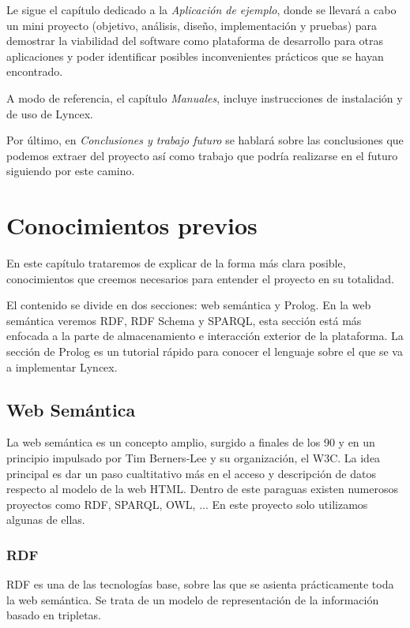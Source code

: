 \documentclass[openright,twoside,12pt]{book}
\begin{document}
Le sigue el capítulo dedicado a la \textit{Aplicación de ejemplo}, donde se llevará a cabo un mini proyecto (objetivo, análisis, diseño, implementación y pruebas) para demostrar la viabilidad del software como plataforma de desarrollo para otras aplicaciones y poder identificar posibles inconvenientes prácticos que se hayan encontrado.

A modo de referencia, el capítulo \textit{Manuales}, incluye instrucciones de instalación y de uso de Lyncex.

Por último, en \textit{Conclusiones y trabajo futuro} se hablará sobre las conclusiones que podemos extraer del proyecto así como trabajo que podría realizarse en el futuro siguiendo por este camino.


\chapter{Conocimientos previos}

En este capítulo trataremos de explicar de la forma más clara posible, conocimientos que creemos necesarios para entender el proyecto en su totalidad.

El contenido se divide en dos secciones: web semántica y Prolog. En la web semántica veremos RDF, RDF Schema y SPARQL, esta sección está más enfocada a la parte de almacenamiento e interacción exterior de la plataforma. La sección de Prolog es un tutorial rápido para conocer el lenguaje sobre el que se va a implementar Lyncex.

\section{Web Semántica}

La web semántica es un concepto amplio\cite{semanticweb}, surgido a finales de los 90 y en un principio impulsado por Tim Berners-Lee y su organización, el W3C. La idea principal es dar un paso cualtitativo más en el acceso y descripción de datos respecto al modelo de la web HTML. Dentro de este paraguas existen numerosos proyectos como RDF\cite{rdf11}, SPARQL\cite{sparql}, OWL\cite{owl}, ... En este proyecto solo utilizamos algunas de ellas.

\subsection{RDF}

RDF es una de las tecnologías base, sobre las que se asienta prácticamente toda la web semántica. Se trata de un modelo de representación de la información basado en tripletas.\cite{rdf11}
\end{document}
